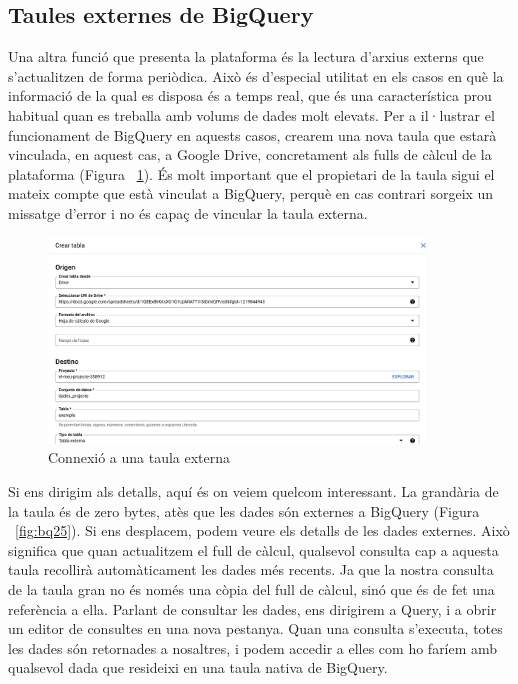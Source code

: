 \documentclass[12pt,longbibliography]{article}
\theoremstyle{definition}
\theoremstyle{remark}
\begin{document}
\subsection{Taules externes de BigQuery}

Una altra funció que presenta la plataforma és la lectura d'arxius externs que s'actualitzen de forma periòdica. Això és d'especial utilitat en els casos en què la informació de la qual es disposa és a temps real, que és una característica prou habitual quan es treballa amb volums de dades molt elevats. Per a il·lustrar el funcionament de BigQuery en aquests casos, crearem una nova taula que estarà vinculada, en aquest cas, a Google Drive, concretament als fulls de càlcul de la plataforma (Figura ~\ref{fig:bq24}). És molt important que el propietari de la taula sigui el mateix compte que està vinculat a BigQuery, perquè en cas contrari sorgeix un missatge d'error i no és capaç de vincular la taula externa.


\begin{figure}[h!]
\begin{center}
\includegraphics[width=10cm]{bq24}
\end{center}
\caption{Connexió a una taula externa}
\label{fig:bq24}
\end{figure}



Si ens dirigim als detalls, aquí és on veiem quelcom interessant. La grandària de la taula és de zero bytes, atès que les dades són externes a BigQuery (Figura ~\ref{fig:bq25}). Si ens desplacem, podem veure els detalls de les dades externes. Això significa que quan actualitzem el full de càlcul, qualsevol consulta cap a aquesta taula recollirà automàticament les dades més recents. Ja que la nostra consulta de la taula gran no és només una còpia del full de càlcul, sinó que és de fet una referència a ella. Parlant de consultar les dades, ens dirigirem a Query, i a obrir un editor de consultes en una nova pestanya. Quan una consulta s'executa, totes les dades són retornades a nosaltres, i podem accedir a elles com ho faríem amb qualsevol dada que resideixi en una taula nativa de BigQuery. 
\end{document}
